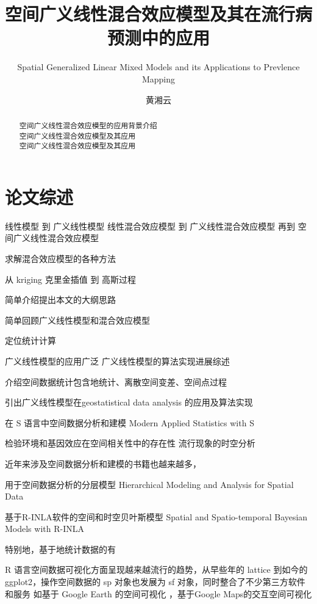 \documentclass[]{article}
\title{空间广义线性混合效应模型及其在流行病预测中的应用}
\subtitle{Spatial Generalized Linear Mixed Models and its Applications to
Prevlence Mapping}
\author{黄湘云}
\date{}
\begin{document}
\maketitle
\begin{abstract}
空间广义线性混合效应模型的应用背景介绍\\
空间广义线性混合效应模型及其应用\\
空间广义线性混合效应模型及其应用
\end{abstract}

{
\hypersetup{linkcolor=black}
\setcounter{tocdepth}{4}
\tableofcontents
}
\section{论文综述}

线性模型 到 广义线性模型 线性混合效应模型 到 广义线性混合效应模型 再到
空间广义线性混合效应模型

求解混合效应模型的各种方法

从 kriging 克里金插值 到 高斯过程

简单介绍提出本文的大纲思路

简单回顾广义线性模型和混合效应模型

定位统计计算

广义线性模型的应用广泛 广义线性模型的算法实现进展综述

介绍空间数据统计包含地统计、离散空间变差、空间点过程

引出广义线性模型在geostatistical data analysis 的应用及算法实现

在 S 语言中空间数据分析和建模 Modern Applied Statistics with S
\citep{MASS2002}

检验环境和基因效应在空间相关性中的存在性 \citep{spaMM2014}
流行现象的时空分析\citep{surveillance2017}

近年来涉及空间数据分析和建模的书籍也越来越多，

用于空间数据分析的分层模型 Hierarchical Modeling and Analysis for
Spatial Data \citep{Banerjee2015}

基于R-INLA软件的空间和时空贝叶斯模型 Spatial and Spatio-temporal
Bayesian Models with R-INLA \citep{Blangiardo2015}

特别地，基于地统计数据的有 \citep{Schl2016Using}

R 语言空间数据可视化方面呈现越来越流行的趋势，从早些年的 lattice
\citep{lattice2008} 到如今的 ggplot2\citep{ggplot22016}，操作空间数据的
sp 对象也发展为 sf 对象，同时整合了不少第三方软件和服务 如基于 Google
Earth 的空间可视化 \citep{plotKML2015} ，基于Google Maps的交互空间可视化
\citep{plotGoogleMaps2012}
\end{document}
